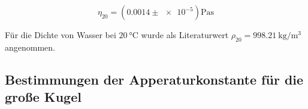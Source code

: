 \begin{equation}
\label{eq:viskosi_wasser}
\eta_{20}=\left(\num{0.0014}\pm\num{e-5}\right) \si{\pascal\second}
\end{equation}

Für die Dichte von Wasser bei $\SI{20}{\degreeCelsius}$ wurde als
Literaturwert $\rho_{20}=\SI{998.21}{\kilogram\per\cubic\meter}$ angenommen. %

\subsection{Bestimmungen der Apperaturkonstante für die große Kugel}





